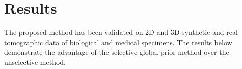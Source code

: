 \documentclass[journal]{IEEEtran}
\begin{document}
\section{Results}
\label{sec:results}

The proposed method has been validated on 2D and 3D synthetic and real tomographic data of biological and medical specimens. The results below demonstrate the advantage of the selective global prior method over the unselective method.



\end{document}
